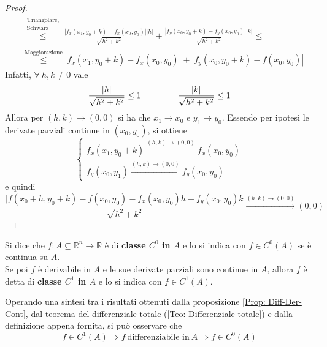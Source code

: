 \begin{proof}
\begin{equation}
\begin{aligned}
                &\overset{\substack{\text{Triangolare,}\\\text{Schwarz}}}{\leq} \frac{|f_x(x_1, y_0+k)-f_x(x_0, y_0)||h|}{\sqrt{h^2+k^2}}+\frac{|f_y(x_0, y_0+k)-f_y(x_0, y_0)||k|}{\sqrt{h^2+k^2}}\leq\\
                &\overset{\text{Maggiorazione}}{\leq} |f_x(x_1, y_0+k)-f_x(x_0, y_0)|+|f_y(x_0, y_0+k)-f(x_0, y_0)|
            \end{aligned}
        \end{equation}
        Infatti, $\forall\ h,k \neq 0$ vale
        \begin{equation}
            \frac{|h|}{\sqrt{h^2+k^2}}\leq 1 \hspace{1.5 cm} \frac{|k|}{\sqrt{h^2+k^2}}\leq 1
        \end{equation}
        Allora per $(h,k) \to (0,0)$ si ha che $x_1 \to x_0$ e $y_1 \to y_0$. Essendo per ipotesi le derivate parziali continue in $(x_0, y_0)$, si ottiene
        \begin{equation}
            \begin{cases}
                f_x(x_1, y_0+k) \overset{(h, k) \to (0,0)}{\to} f_x(x_0, y_0)\\
                f_y(x_0, y_1) \overset{(h, k) \to (0,0)}{\to} f_y(x_0, y_0)
            \end{cases}
        \end{equation} 
        e quindi 
        \begin{equation}
            \frac{|f(x_0+h, y_0+k)-f(x_0, y_0)-f_x(x_0, y_0)h-f_y(x_0, y_0)k}{\sqrt{h^2+k^2}} \overset{(h,k)\to(0,0)}{\to} (0,0)
        \end{equation}
    \end{proof}
\begin{definition} \label{Def:C0 e C1}
    Si dice che $f:A \subseteq \mathbb{R}^n\to \mathbb{R}$ è di \textbf{classe $C^0$ in $A$} e lo si indica con $f \in C^0(A)$ se è continua su $A$.\\
    Se poi $f$ è derivabile in $A$ e le sue derivate parziali sono continue in $A$, allora $f$ è detta di \textbf{classe $C^1$ in $A$} e lo si indica con $f \in C^1(A)$.
\end{definition}
    \begin{oss}
        Operando una sintesi tra i risultati ottenuti dalla proposizione \ref{Prop: Diff-Der-Cont}, dal teorema del differenziale totale (\ref{Teo: Differenziale totale}) e dalla definizione appena fornita, si può osservare che
        \begin{equation} \label{Eq: Relazione C^1 -> diff -> C^0}
            f \in C^1(A) \Rightarrow f\ \text{differenziabile in}\ A \Rightarrow f \in C^{0}(A)
        \end{equation}
    \end{oss} 
